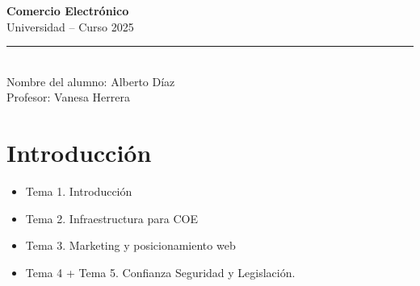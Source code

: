 \documentclass[11pt,a4paper]{article}
\begin{document}
	\begin{center}
		{\huge \textbf{Comercio Electrónico}} \\[0.5cm]
		{\Large Universidad \;--\; Curso 2025} \\[0.3cm]
		\rule{0.8\linewidth}{0.5pt} \\[0.3cm]
		{\faUser\; Nombre del alumno: Alberto Díaz} \\[0.2cm]
		{\faChalkboardTeacher\; Profesor: Vanesa Herrera} \\[1.2cm]
	\end{center}

	\section*{Introducción}

	\begin{TemarioBox}
		\begin{itemize}[leftmargin=1.5em]
			\item Tema 1. Introducción
			\item Tema 2. Infraestructura para COE
			\item Tema 3. Marketing y posicionamiento web
			\item Tema 4 + Tema 5. Confianza Seguridad y Legislación.
		\end{itemize}
	\end{TemarioBox}
\end{document}
